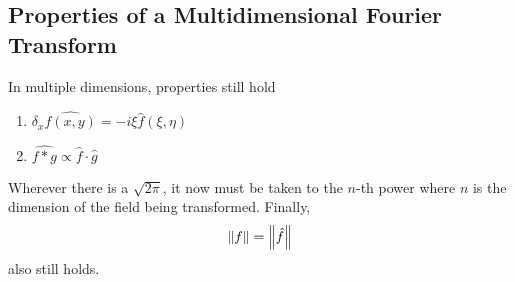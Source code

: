\subsection{Properties of a Multidimensional Fourier Transform}
In multiple dimensions, properties still hold
\begin{enumerate}
    \item $\delta_x \widehat{f(x,y)} = -i\xi \hat{f}(\xi, \eta)$
    \item $\widehat{f*g} \propto \hat{f} \cdot \hat{g}$
\end{enumerate}
Wherever there is a $\sqrt{2\pi}$, it now must be taken to the $n$-th power where $n$ is the dimension of the field being transformed. Finally,
\begin{align}
    \norm{f} = \norm{\hat{f}}
\end{align}
also still holds.